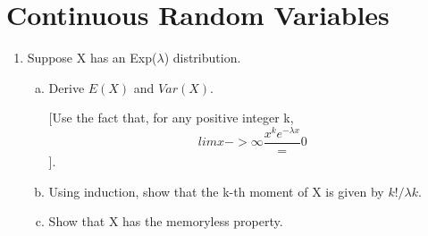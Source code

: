 \documentclass[a4paper,12pt]{article}
\begin{document}
\section{Continuous Random Variables}


\begin{enumerate}
\item 	Suppose X has an Exp($\lambda$) distribution.
\begin{enumerate}[(a)]
\item Derive $E(X)$ and $Var(X)$. 

[Use the fact that, for any positive integer k, $$lim x->\infty \frac{x^k e^{-\lambda x}} = 0$$].
\item Using induction, show that the k-th moment of X is given by $k!/\lambda k $.
\item Show that X has the memoryless property.
\end{enumerate}



\end{enumerate}
\end{document}
